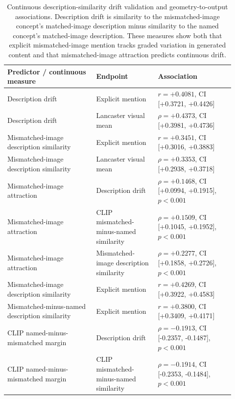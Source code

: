 \documentclass{article}
\begin{document}
\begin{table}[!htbp]
\centering
\caption{Continuous description-similarity drift validation and geometry-to-output associations. Description drift is similarity to the mismatched-image concept's matched-image description minus similarity to the named concept's matched-image description. These measures show both that explicit mismatched-image mention tracks graded variation in generated content and that mismatched-image attraction predicts continuous drift.}
\label{tab:continuous_drift_validation}
\footnotesize
\begin{tabular}{@{}p{0.36\linewidth}p{0.25\linewidth}p{0.31\linewidth}@{}}
\toprule
Predictor / continuous measure & Endpoint & Association \\
\midrule
Description drift & Explicit mention & \(r=+0.4081\), CI [+0.3721, +0.4426] \\
Description drift & Lancaster visual mean & \(\rho=+0.4373\), CI [+0.3981, +0.4736] \\
Mismatched-image description similarity & Explicit mention & \(r=+0.3451\), CI [+0.3016, +0.3883] \\
Mismatched-image description similarity & Lancaster visual mean & \(\rho=+0.3353\), CI [+0.2938, +0.3718] \\
Mismatched-image attraction & Description drift & \(\rho=+0.1468\), CI [+0.0994, +0.1915], \(p<0.001\) \\
Mismatched-image attraction & CLIP mismatched-minus-named similarity & \(\rho=+0.1509\), CI [+0.1045, +0.1952], \(p<0.001\) \\
Mismatched-image attraction & Mismatched-image description similarity & \(\rho=+0.2277\), CI [+0.1858, +0.2726], \(p<0.001\) \\
Mismatched-image description similarity & Explicit mention & \(r=+0.4269\), CI [+0.3922, +0.4583] \\
Mismatched-minus-named description similarity & Explicit mention & \(r=+0.3800\), CI [+0.3409, +0.4171] \\
CLIP named-minus-mismatched margin & Description drift & \(\rho=-0.1913\), CI [-0.2357, -0.1487], \(p<0.001\) \\
CLIP named-minus-mismatched margin & CLIP mismatched-minus-named similarity & \(\rho=-0.1914\), CI [-0.2353, -0.1484], \(p<0.001\) \\
\bottomrule
\end{tabular}
\end{table}
\end{document}
